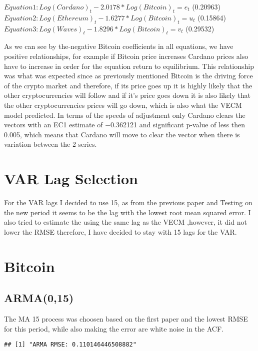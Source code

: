 \documentclass[
]{article}
\begin{document}
\(Equation 1 : Log(Cardano)_t-{2.0178}*Log(Bitcoin)_t=e_t\) (0.20963)
\(Equation 2 : Log(Ethereum)_t-{1.6277}*Log(Bitcoin)_t=u_t\) (0.15864)
\(Equation 3 : Log(Waves)_t-{1.8296}*Log(Bitcoin)_t=v_t\) (0.29532)

As we can see by the-negative Bitcoin coefficients in all equations, we
have positive relationships, for example if Bitcoin price increases
Cardano prices also have to increase in order for the equation return to
equilibrium. This relationship was what was expected since as previously
mentioned Bitcoin is the driving force of the crypto market and
therefore, if its price goes up it is highly likely that the other
cryptocurrencies will follow and if it's price goes down it is also
likely that the other cryptocurrencies prices will go down, which is
also what the VECM model predicted. In terms of the speeds of adjustment
only Cardano clears the vectors with an EC1 estimate of −0.362121 and
significant p-value of less then 0.005, which means that Cardano will
move to clear the vector when there is variation between the 2 series.

\hypertarget{var-lag-selection}{%
\section{VAR Lag Selection}\label{var-lag-selection}}

For the VAR lags I decided to use 15, as from the previous paper and
Testing on the new period it seems to be the lag with the lowest root
mean squared error. I also tried to estimate the using the same lag as
the VECM ,however, it did not lower the RMSE therefore, I have decided
to stay with 15 lags for the VAR.

\hypertarget{bitcoin}{%
\section{Bitcoin}\label{bitcoin}}

\hypertarget{arma015}{%
\subsection{ARMA(0,15)}\label{arma015}}

The MA 15 process was choosen based on the first paper and the lowest
RMSE for this period, while also making the error are white noise in the
ACF.

\begin{verbatim}
## [1] "ARMA RMSE: 0.110146446508882"
\end{verbatim}
\end{document}
